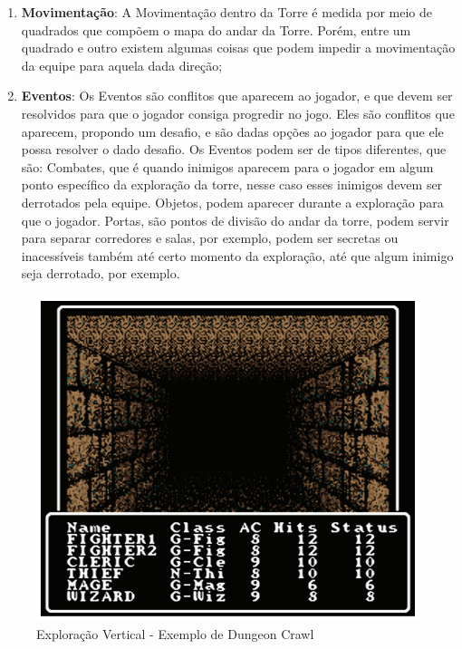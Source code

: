 \documentclass[11pt]{article} %
\begin{document}
\begin{enumerate}
  \item \textbf{Movimentação}: A Movimentação dentro da Torre é medida por meio de quadrados que compõem o mapa do andar da Torre. Porém, entre um quadrado e outro existem algumas coisas que podem impedir a movimentação da equipe para aquela dada direção;
  \item \textbf{Eventos}: Os Eventos são conflitos que aparecem ao jogador, e que devem ser resolvidos para que o jogador consiga progredir no jogo. Eles são conflitos que aparecem, propondo um desafio, e são dadas opções ao jogador para que ele possa resolver o dado desafio. Os Eventos podem ser de tipos diferentes, que são: Combates, que é quando inimigos aparecem para o jogador em algum ponto específico da exploração da torre, nesse caso esses inimigos devem ser derrotados pela equipe. Objetos, podem aparecer durante a exploração para que o jogador. Portas, são pontos de divisão do andar da torre, podem servir para separar corredores e salas, por exemplo, podem ser secretas ou inacessíveis também até certo momento da exploração, até que algum inimigo seja derrotado, por exemplo.
\end{enumerate}
\newpage

\begin{figure}[!htp]
\centering
\includegraphics[scale=0.3]{res/Dungeon_Crawler.png}
\caption{Exploração Vertical - Exemplo de Dungeon Crawl}
\label{Exploração Vertical - Exemplo de Dungeon Crawl}
\end{figure}
\end{document}
